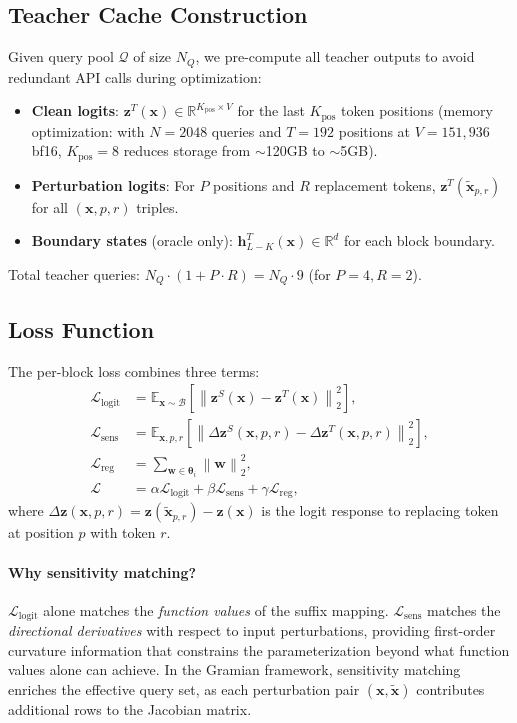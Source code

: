 \documentclass{article}
\newcommand{\R}{\mathbb{R}}
\newcommand{\E}{\mathbb{E}}
\newcommand{\cQ}{\mathcal{Q}}
\newcommand{\cL}{\mathcal{L}}
\newcommand{\btheta}{\boldsymbol{\theta}}
\newcommand{\bz}{\mathbf{z}}
\newcommand{\bh}{\mathbf{h}}
\newcommand{\bx}{\mathbf{x}}
\newcommand{\cB}{\mathcal{B}}
\newcommand{\norm}[1]{\left\lVert #1 \right\rVert}
\begin{document}
\subsection{Teacher Cache Construction}
\label{sec:cache}

Given query pool $\cQ$ of size $N_Q$, we pre-compute all teacher outputs to avoid redundant API calls during optimization:

\begin{itemize}
    \item \textbf{Clean logits}: $\bz^T(\bx) \in \R^{K_\text{pos} \times V}$ for the last $K_\text{pos}$ token positions (memory optimization: with $N = 2048$ queries and $T = 192$ positions at $V = 151{,}936$ bf16, $K_\text{pos} = 8$ reduces storage from $\sim$120GB to $\sim$5GB).
    \item \textbf{Perturbation logits}: For $P$ positions and $R$ replacement tokens, $\bz^T(\tilde{\bx}_{p,r})$ for all $(\bx, p, r)$ triples.
    \item \textbf{Boundary states} (oracle only): $\bh^T_{L-K}(\bx) \in \R^{d}$ for each block boundary.
\end{itemize}

Total teacher queries: $N_Q \cdot (1 + P \cdot R) = N_Q \cdot 9$ (for $P=4, R=2$).

\subsection{Loss Function}
\label{sec:loss}

The per-block loss combines three terms:
\begin{align}
    \cL_\text{logit} &= \E_{\bx \sim \cB}\left[\norm{\bz^S(\bx) - \bz^T(\bx)}_2^2\right], \label{eq:loss-logit} \\
    \cL_\text{sens} &= \E_{\bx, p, r}\left[\norm{\Delta\bz^S(\bx, p, r) - \Delta\bz^T(\bx, p, r)}_2^2\right], \label{eq:loss-sens} \\
    \cL_\text{reg} &= \sum_{\mathbf{w} \in \btheta_i} \norm{\mathbf{w}}_2^2, \label{eq:loss-reg} \\
    \cL &= \alpha \cL_\text{logit} + \beta \cL_\text{sens} + \gamma \cL_\text{reg}, \label{eq:loss-total}
\end{align}
where $\Delta\bz(\bx, p, r) = \bz(\tilde{\bx}_{p,r}) - \bz(\bx)$ is the logit response to replacing token at position $p$ with token $r$.

\paragraph{Why sensitivity matching?}
$\cL_\text{logit}$ alone matches the \emph{function values} of the suffix mapping. $\cL_\text{sens}$ matches the \emph{directional derivatives} with respect to input perturbations, providing first-order curvature information that constrains the parameterization beyond what function values alone can achieve. In the Gramian framework, sensitivity matching enriches the effective query set, as each perturbation pair $(\bx, \tilde{\bx})$ contributes additional rows to the Jacobian matrix.
\end{document}
